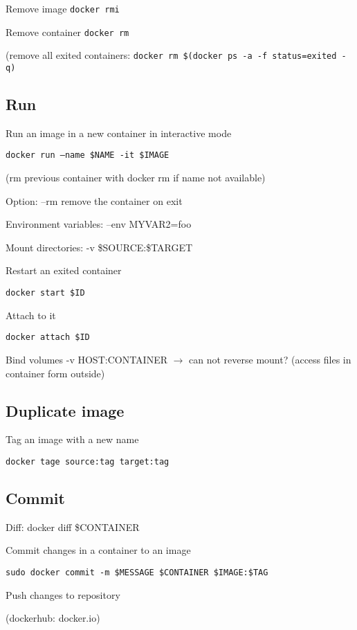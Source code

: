Remove image \texttt{docker rmi}

Remove container \texttt{docker rm}

(remove all exited containers: \texttt{docker rm \$(docker ps -a -f status=exited -q)}


\subsection*{Run}


Run an image in a new container in interactive mode

\texttt{docker run --name \$NAME -it \$IMAGE}

(rm previous container with docker rm if name not available)

Option: --rm remove the container on exit

Environment variables: --env MYVAR2=foo

Mount directories: -v \$SOURCE:\$TARGET

Restart an exited container

\texttt{docker start \$ID}

Attach to it

\texttt{docker attach \$ID}

Bind volumes -v HOST:CONTAINER
$\rightarrow$ can not reverse mount? (access files in container form outside)




\subsection*{Duplicate image}


Tag an image with a new name

\texttt{docker tage source:tag target:tag}

\subsection*{Commit}

Diff: docker diff \$CONTAINER

Commit changes in a container to an image

\texttt{sudo docker commit -m \$MESSAGE \$CONTAINER \$IMAGE:\$TAG}

\bigskip

Push changes to repository

(dockerhub: docker.io)

